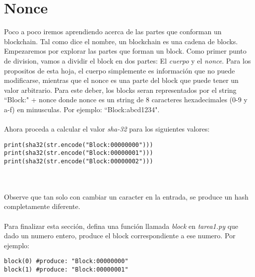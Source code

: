 \documentclass{article}
\begin{document}
\section{Nonce}
Poco a poco iremos aprendiendo acerca de las partes que conforman un blockchain.
Tal como dice el nombre, un blockchain es una cadena de blocks. Empezaremos por
explorar las partes que forman un block. Como primer punto de division, vamos
a dividir el block en dos partes: El \emph{cuerpo} y el \emph{nonce}. Para los propositos de
esta hoja, el cuerpo simplemente es informaci\'{o}n que no puede modificarse,
mientras que el nonce es una parte del block que puede tener un valor arbitrario.
Para este deber, los blocks seran representados por el string ``Block:" + nonce
donde nonce es un string de 8 caracteres hexadecimales (0-9 y a-f) en minusculas.
Por ejemplo: ``Block:abcd1234".
\\\\
Ahora proceda a calcular el valor \emph{sha-32} para los siguientes valores:
\begin{lstlisting}
print(sha32(str.encode("Block:00000000")))
print(sha32(str.encode("Block:00000001")))
print(sha32(str.encode("Block:00000002")))
\end{lstlisting}
\\\\
Observe que tan solo con cambiar un caracter en la entrada, se produce
un hash completamente diferente.
\\\\
Para finalizar esta secci\'{o}n, defina una funci\'{o}n llamada \emph{block} en \emph{tarea1.py} que
dado un numero entero, produce el block correspondiente a ese numero. Por ejemplo:
\begin{lstlisting}
block(0) #produce: "Block:00000000"
block(1) #produce: "Block:00000001"
\end{lstlisting}
\end{document}
